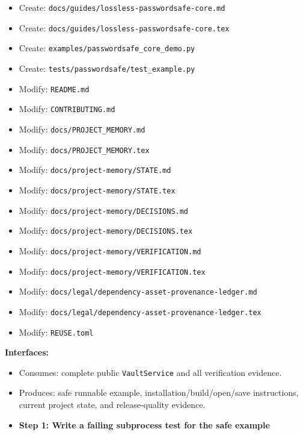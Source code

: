 \documentclass[
  letterpaper,
]{article}
\newcommand{\passthrough}[1]{#1}
\providecommand{\tightlist}{%
  \setlength{\itemsep}{0pt}\setlength{\parskip}{0pt}}
\begin{document}
\begin{itemize}
\tightlist
\item
  Create: \nolinkurl{docs/guides/lossless-passwordsafe-core.md}
\item
  Create: \nolinkurl{docs/guides/lossless-passwordsafe-core.tex}
\item
  Create: \nolinkurl{examples/passwordsafe_core_demo.py}
\item
  Create: \nolinkurl{tests/passwordsafe/test_example.py}
\item
  Modify: \passthrough{\lstinline!README.md!}
\item
  Modify: \nolinkurl{CONTRIBUTING.md}
\item
  Modify: \nolinkurl{docs/PROJECT_MEMORY.md}
\item
  Modify: \nolinkurl{docs/PROJECT_MEMORY.tex}
\item
  Modify: \nolinkurl{docs/project-memory/STATE.md}
\item
  Modify: \nolinkurl{docs/project-memory/STATE.tex}
\item
  Modify: \nolinkurl{docs/project-memory/DECISIONS.md}
\item
  Modify: \nolinkurl{docs/project-memory/DECISIONS.tex}
\item
  Modify: \nolinkurl{docs/project-memory/VERIFICATION.md}
\item
  Modify: \nolinkurl{docs/project-memory/VERIFICATION.tex}
\item
  Modify: \nolinkurl{docs/legal/dependency-asset-provenance-ledger.md}
\item
  Modify: \nolinkurl{docs/legal/dependency-asset-provenance-ledger.tex}
\item
  Modify: \nolinkurl{REUSE.toml}
\end{itemize}

\textbf{Interfaces:}

\begin{itemize}
\tightlist
\item
  Consumes: complete public \nolinkurl{VaultService} and all verification evidence.
\item
  Produces: safe runnable example, installation/build/open/save instructions, current project state, and release-quality
  evidence.
\end{itemize}

\begin{itemize}
\tightlist
\item[$\square$]
  \textbf{Step 1: Write a failing subprocess test for the safe example}
\end{itemize}
\end{document}
